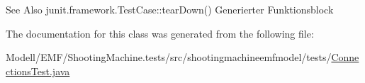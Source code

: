 \begin{DoxySeeAlso}{See Also}
junit.\-framework.\-Test\-Case\-::tear\-Down() Generierter Funktionsblock 
\end{DoxySeeAlso}


The documentation for this class was generated from the following file\-:\begin{DoxyCompactItemize}
\item 
Modell/\-E\-M\-F/\-Shooting\-Machine.\-tests/src/shootingmachineemfmodel/tests/\hyperlink{_connections_test_8java}{Connections\-Test.\-java}\end{DoxyCompactItemize}
